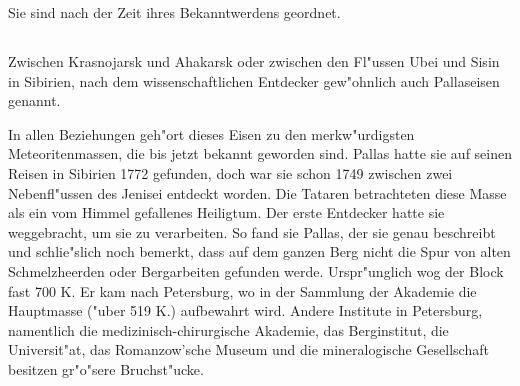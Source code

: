 \documentclass[a4paper, 11pt, oneside]{article}
\begin{document}
Sie sind nach der Zeit ihres Bekanntwerdens geordnet.

\subsection{}
\LARGE
\paragraph{}
Zwischen Krasnojarsk und Ahakarsk oder zwischen den Fl"ussen Ubei und Sisin in Sibirien, nach dem wissenschaftlichen Entdecker gew"ohnlich auch Pallaseisen genannt.

In allen Beziehungen geh"ort dieses Eisen zu den merkw"urdigsten Meteoritenmassen, die bis jetzt bekannt geworden sind. Pallas hatte sie auf seinen Reisen in Sibirien 1772 gefunden, doch war sie schon 1749 zwischen zwei Nebenfl"ussen des Jenisei entdeckt worden. Die Tataren betrachteten diese Masse als ein vom Himmel gefallenes Heiligtum. Der erste Entdecker hatte sie weggebracht, um sie zu verarbeiten. So fand sie Pallas, der sie genau beschreibt und schlie"slich noch bemerkt, dass auf dem ganzen Berg nicht die Spur von alten Schmelzheerden oder Bergarbeiten gefunden werde. Urspr"unglich wog der Block fast 700 K. Er kam nach Petersburg, wo in der Sammlung der Akademie die Hauptmasse ("uber 519 K.) aufbewahrt wird. Andere Institute in Petersburg, namentlich die medizinisch-chirurgische Akademie, das Berginstitut, die Universit"at, das Romanzow'sche Museum und die mineralogische Gesellschaft besitzen gr"o"sere Bruchst"ucke.
\end{document}
